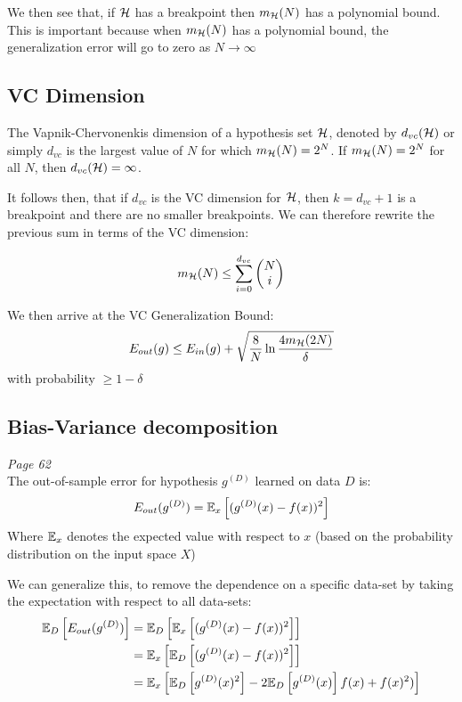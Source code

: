     We then see that, if $\mathcal{H}$ has a breakpoint then $m_{\mathcal{H}}(N)$ has a 
    polynomial bound. This is important because when $m_{\mathcal{H}}(N)$ has a 
    polynomial bound, the generalization error will go to zero as $N 
    \rightarrow \infty$
    
    \subsection{VC Dimension}
    The Vapnik-Chervonenkis dimension of a hypothesis set $\mathcal{H}$, denoted by 
    $d_{vc}(\mathcal{H})$ or simply $d_{vc}$ is the largest value of $N$ for which 
    $m_{\mathcal{H}}(N)=2^N$. If $m_{\mathcal{H}}(N)=2^N$ for all $N$, then $d_{vc}(\mathcal{H})=\infty$.
    
    It follows then, that if $d_{vc}$ is the VC dimension for $\mathcal{H}$, then $k = 
    d_{vc} + 1$ is a breakpoint and there are no smaller breakpoints. We can 
    therefore rewrite the previous sum in terms of the VC dimension:
    
    \begin{equation*}
        m_{\mathcal{H}}(N) \leq \sum_{i=0}^{d_{vc}} \begin{pmatrix}
        N\\i
        \end{pmatrix}
    \end{equation*}
    
    We then arrive at the VC Generalization Bound:
    \begin{equation}
        E_{out}(g) \leq E_{in}(g) + \sqrt{\frac{8}{N} \ln 
        \frac{4m_{\mathcal{H}}(2N)}{\delta}}
    \end{equation}
    with probability $\geq 1-\delta$
    
    \subsection{Bias-Variance decomposition}
    \textit{Page 62}\\
    The out-of-sample error for hypothesis $g^{(D)}$ learned on data $D$ is:
    \begin{equation*}
        E_{out}(g^{(D)}) = \mathbb{E}_x\left[(g^{(D)}(x)-f(x))^2\right]
    \end{equation*}
    Where $\mathbb{E}_x$ denotes the expected value with respect to $x$ (based on the 
    probability distribution on the input space $X$)
    
    We can generalize this, to remove the dependence on a specific data-set by 
    taking the expectation with respect to all data-sets:
    \begin{align*}
        \mathbb{E}_D\left[E_{out}(g^{(D)})\right] &=
        \mathbb{E}_D\left[\mathbb{E}_x\left[(g^{(D)}(x)-f(x))^2\right]\right]\\
            &= \mathbb{E}_x\left[\mathbb{E}_D\left[(g^{(D)}(x)-f(x))^2\right]\right]\\
            &= \mathbb{E}_x\left[\mathbb{E}_D\left[g^{(D)}(x)^2\right] - 
            2\mathbb{E}_D\left[g^{(D)}(x)\right]f(x)+f(x)^2)\right]
    \end{align*}
    
